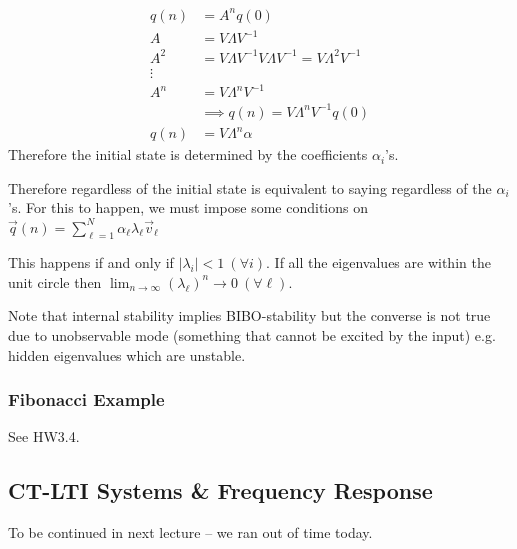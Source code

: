 \begin{align*}
    q(n) &= A^n q(0)
    \\
    A &= V\Lambda V^{-1}
    \\
    A^2
    &= V\Lambda V^{-1}V\Lambda V^{-1} = V\Lambda^2 V^{-1}
    \\
    \vdots
    \\
    A^n 
    &= V\Lambda^n V^{-1}
    \\
    &\implies
    q(n) = V\Lambda^n V^{-1} q(0)
    \\
    q(n) &= V\Lambda^n \alpha
\end{align*}
Therefore the initial state is determined by the coefficients $\alpha_i$'s.

Therefore regardless of the initial state is equivalent to saying regardless of the $\alpha_i$'s. For this to happen, we must impose some conditions on $\vec q(n)=\sum_{\ell=1}^N \alpha_\ell \lambda_\ell \vec v_\ell$

This happens if and only if $|\lambda_i|<1\ (\forall i)$. If all the eigenvalues are within the unit circle then $\displaystyle \lim_{n\to\infty} (\lambda_\ell)^n \to 0\ (\forall \ell)$.

Note that internal stability implies BIBO-stability but the converse is not true due to unobservable mode (something that cannot be excited by the input) e.g. hidden eigenvalues which are unstable.

\subsubsection{Fibonacci Example}
See HW3.4.

\subsection{CT-LTI Systems \& Frequency Response}
To be continued in next lecture -- we ran out of time today.
